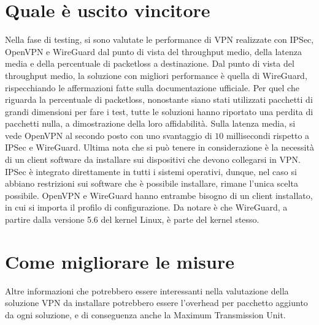 \section{Quale è uscito vincitore}
Nella fase di testing, si sono valutate le performance di VPN realizzate con IPSec, OpenVPN e WireGuard dal punto di vista del throughput medio, della latenza media e della percentuale di packetloss a destinazione.
Dal punto di vista del throughput medio, la soluzione con migliori performance è quella di WireGuard, rispecchiando le affermazioni fatte sulla documentazione ufficiale.
Per quel che riguarda la percentuale di packetloss, nonostante siano stati utilizzati pacchetti di grandi dimensioni per fare i test, tutte le soluzioni hanno riportato una perdita di pacchetti nulla, a dimostrazione della loro affidabilità.
Sulla latenza media, si vede OpenVPN al secondo posto con uno svantaggio di $10$ millisecondi rispetto a IPSec e WireGuard.
Ultima nota che si può tenere in considerazione è la necessità di un client software da installare sui dispositivi che devono collegarsi in VPN.
IPSec è integrato direttamente in tutti i sistemi operativi, dunque, nel caso si abbiano restrizioni sui software che è possibile installare, rimane l'unica scelta possibile.
OpenVPN e WireGuard hanno entrambe bisogno di un client installato, in cui si importa il profilo di configurazione. Da notare è che WireGuard, a partire dalla versione 5.6 del kernel Linux, è parte del kernel stesso.

\section{Come migliorare le misure}
Altre informazioni che potrebbero essere interessanti nella valutazione della soluzione VPN da installare potrebbero essere l'overhead per pacchetto aggiunto da ogni soluzione, e di conseguenza anche la Maximum Transmission Unit.
